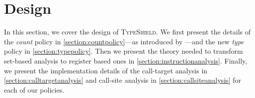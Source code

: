 \section{Design}
\label{chapter:Design}

In this section, we cover the design of \textsc{TypeShield}. We first present the details of the 
\emph{count} policy in \cref{section:countpolicy}---as introduced by \cite{veen:typearmor}---and the
new \emph{type} policy in \cref{section:typepolicy}. 
Then we present the theory needed to transform set-based analysis to register based ones in \cref{section:instructionanalysis}. 
Finally, we present the implementation details of the call-target analysis in 
\cref{section:calltargetanalysis} and call-site analysis in \cref{section:callsiteanalysis} 
for each of our policies. 

